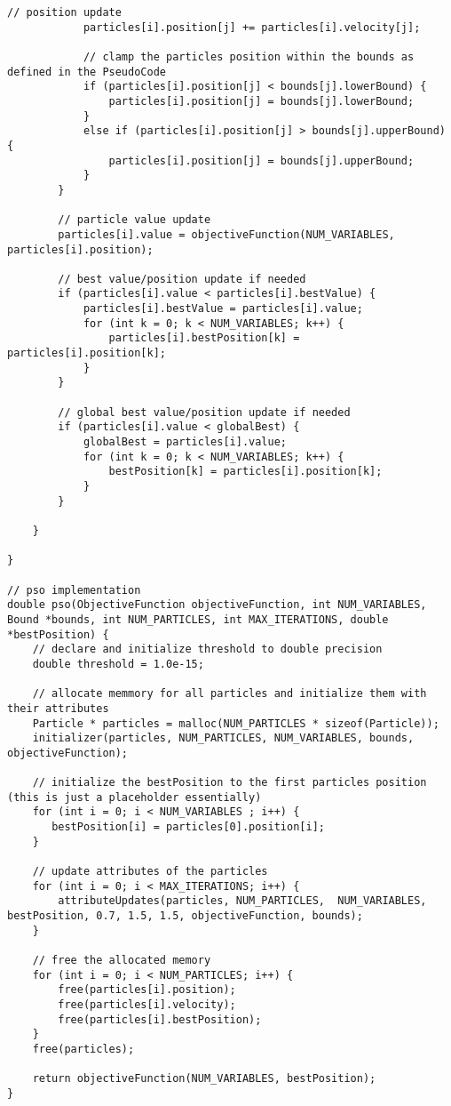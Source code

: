 \documentclass[12pt]{article}
\begin{document}
\begin{lstlisting}[basicstyle=\small]
            // position update
            particles[i].position[j] += particles[i].velocity[j]; 

            // clamp the particles position within the bounds as defined in the PseudoCode 
            if (particles[i].position[j] < bounds[j].lowerBound) { 
                particles[i].position[j] = bounds[j].lowerBound;
            }
            else if (particles[i].position[j] > bounds[j].upperBound) {
                particles[i].position[j] = bounds[j].upperBound;
            }
        }
        
        // particle value update 
        particles[i].value = objectiveFunction(NUM_VARIABLES, particles[i].position); 

        // best value/position update if needed
        if (particles[i].value < particles[i].bestValue) {
            particles[i].bestValue = particles[i].value; 
            for (int k = 0; k < NUM_VARIABLES; k++) {
                particles[i].bestPosition[k] = particles[i].position[k]; 
            }
        }

        // global best value/position update if needed 
        if (particles[i].value < globalBest) {
            globalBest = particles[i].value; 
            for (int k = 0; k < NUM_VARIABLES; k++) {
                bestPosition[k] = particles[i].position[k]; 
            }
        }

    }

}

// pso implementation 
double pso(ObjectiveFunction objectiveFunction, int NUM_VARIABLES, Bound *bounds, int NUM_PARTICLES, int MAX_ITERATIONS, double *bestPosition) {
    // declare and initialize threshold to double precision
    double threshold = 1.0e-15; 

    // allocate memmory for all particles and initialize them with their attributes
    Particle * particles = malloc(NUM_PARTICLES * sizeof(Particle)); 
    initializer(particles, NUM_PARTICLES, NUM_VARIABLES, bounds, objectiveFunction); 

    // initialize the bestPosition to the first particles position (this is just a placeholder essentially) 
    for (int i = 0; i < NUM_VARIABLES ; i++) {
       bestPosition[i] = particles[0].position[i]; 
    }

    // update attributes of the particles 
    for (int i = 0; i < MAX_ITERATIONS; i++) {
        attributeUpdates(particles, NUM_PARTICLES,  NUM_VARIABLES, bestPosition, 0.7, 1.5, 1.5, objectiveFunction, bounds); 
    }

    // free the allocated memory 
    for (int i = 0; i < NUM_PARTICLES; i++) {
        free(particles[i].position); 
        free(particles[i].velocity); 
        free(particles[i].bestPosition); 
    }
    free(particles); 

    return objectiveFunction(NUM_VARIABLES, bestPosition); 
}
	\end{lstlisting}
\end{document}
